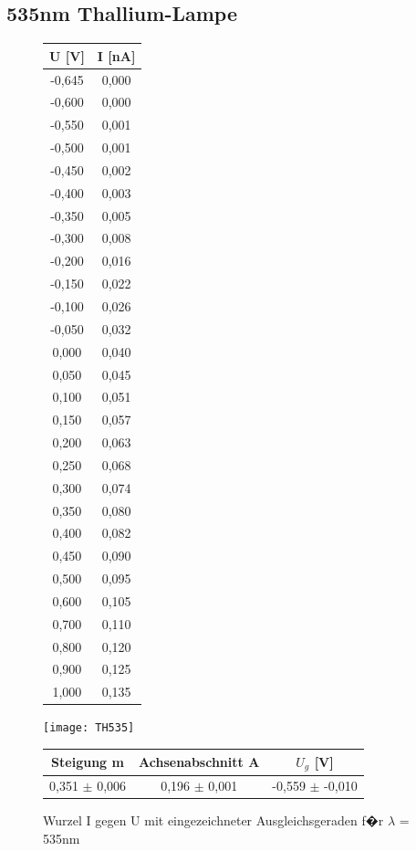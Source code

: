 \documentclass[a4paper, 10pt]{report}%
\begin{document}
	
\newpage
\subsection{535nm Thallium-Lampe}
\begin{figure}[!htbp]
\begin{minipage}[t]{2cm}
\vspace{0pt}
\centering
\begin{center}
\begin{tabular}{c|c}
U [V] & I [nA] \\
\hline
-0,645&	0,000 \\
-0,600&	0,000 \\
-0,550&	0,001 \\
-0,500&	0,001 \\
-0,450&	0,002 \\
-0,400&	0,003 \\
-0,350&	0,005 \\
-0,300&	0,008 \\
-0,200&	0,016 \\
-0,150&	0,022 \\
-0,100&	0,026 \\
-0,050&	0,032 \\
0,000&	0,040 \\
0,050&	0,045 \\
0,100&	0,051 \\
0,150&	0,057 \\
0,200&	0,063 \\
0,250&	0,068 \\
0,300&	0,074 \\
0,350&	0,080 \\
0,400&	0,082 \\
0,450&	0,090 \\
0,500&	0,095 \\
0,600&	0,105 \\
0,700&	0,110 \\
0,800&	0,120 \\
0,900&	0,125 \\
1,000&	0,135
\end{tabular}
\end{center}
\end{minipage}
\hfill
\begin{minipage}[t]{12cm}
\vspace{0pt}
\texttt{[image: TH535]}
\caption{Wurzel I gegen U mit eingezeichneter Ausgleichsgeraden f�r $\lambda$ = 535nm}
\begin{center}
\begin{tabular}{c|c|c}
Steigung m & Achsenabschnitt A & $U_g$ [V]\\
\hline
0,351 $\pm$ 0,006 & 0,196 $\pm$	0,001 & -0,559 $\pm$	-0,010
\end{tabular}
\end{center}
\end{minipage}
\end{figure}
	
\end{document}
